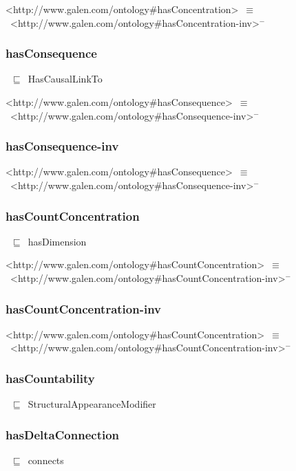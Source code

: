 \documentclass{article}
\begin{document}
<http://www.galen.com/ontology#hasConcentration>~\ensuremath{\equiv}~<http://www.galen.com/ontology#hasConcentration-inv>\ensuremath{^-}

\subsubsection*{hasConsequence}

~\ensuremath{\sqsubseteq}~HasCausalLinkTo

<http://www.galen.com/ontology#hasConsequence>~\ensuremath{\equiv}~<http://www.galen.com/ontology#hasConsequence-inv>\ensuremath{^-}

\subsubsection*{hasConsequence-inv}

<http://www.galen.com/ontology#hasConsequence>~\ensuremath{\equiv}~<http://www.galen.com/ontology#hasConsequence-inv>\ensuremath{^-}

\subsubsection*{hasCountConcentration}

~\ensuremath{\sqsubseteq}~hasDimension

<http://www.galen.com/ontology#hasCountConcentration>~\ensuremath{\equiv}~<http://www.galen.com/ontology#hasCountConcentration-inv>\ensuremath{^-}

\subsubsection*{hasCountConcentration-inv}

<http://www.galen.com/ontology#hasCountConcentration>~\ensuremath{\equiv}~<http://www.galen.com/ontology#hasCountConcentration-inv>\ensuremath{^-}

\subsubsection*{hasCountability}

~\ensuremath{\sqsubseteq}~StructuralAppearanceModifier

\subsubsection*{hasDeltaConnection}

~\ensuremath{\sqsubseteq}~connects
\end{document}
